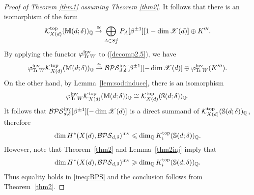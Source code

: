 \documentclass [11pt,oneside,a4paper,mathscr]{amsart}
\theoremstyle{definition}
\renewcommand{\leq}{\leqslant}
\renewcommand{\geq}{\geqslant}
\newcommand{\X}{\mathscr{X}}
\newcommand{\Tr}{\mathop{\rm Tr}}
\begin{document}
\begin{proof}[Proof of Theorem \ref{thm1} assuming Theorem \ref{thm2}]
It follows that there is an isomorphism of the form 
\begin{align}\label{decomp2.5}
	\mathcal{K}_{X(d)}^{\rm{top}}(\mathbb{M}(d; \delta))_{\mathbb{Q}} \stackrel{\cong}{\to}
	\bigoplus_{A \in S_{\delta}^d}P_A[\beta^{\pm 1}][1-\dim \X(d)]\oplus K'''. 
	\end{align}
By applying the functor $\varphi_{\Tr W}^{\rm{inv}}$ to (\ref{decomp2.5}), we have 
\begin{align*}
	\varphi_{\Tr W}^{\rm{inv}}	\mathcal{K}_{X(d)}^{\rm{top}}(\mathbb{M}(d; \delta))_{\mathbb{Q}}
	\stackrel{\cong}{\to}\mathcal{BPS}^{\rm{inv}}_{d, \delta}[\beta^{\pm 1}][-\dim \X(d)] \oplus 
	\varphi_{\Tr W}^{\rm{inv}}(K'''). 
	\end{align*}
 On the other hand, by Lemma~\ref{lem:sod:induce}, there is
 an isomorphism 
\begin{align*}
	\varphi_{\Tr W}^{\rm{inv}}\mathcal{K}_{X(d)}^{\rm{top}}(\mathbb{M}(d; \delta))_{\mathbb{Q}}
	\cong \mathcal{K}_{X(d)}^{\rm{top}}(\mathbb{S}(d; \delta))_{\mathbb{Q}}. 	
\end{align*}
 It follows that 
$\mathcal{BPS}^{\rm{inv}}_{d, \delta}[\beta^{\pm 1}][-\dim \X(d)]$ is a direct 
summand of $\mathcal{K}_{X(d)}^{\rm{top}}(\mathbb{S}(d; \delta))_{\mathbb{Q}}$, therefore 
\begin{align}\label{ineq:BPS}
	\dim H^{\ast}(X(d), \mathcal{BPS}_{d, \delta})^{\rm{inv}} \leq 
	\dim_{\mathbb{Q}}K_i^{\rm{top}}(\mathbb{S}(d; \delta))_{\mathbb{Q}}. 
	\end{align}
 However, note that Theorem~\ref{thm2} and Lemma~\ref{thm2inj} imply that 
 \[\dim H^{\ast}(X(d), \mathcal{BPS}_{d, \delta})^{\rm{inv}} \geq 
	\dim_{\mathbb{Q}}K_i^{\rm{top}}(\mathbb{S}(d; \delta))_{\mathbb{Q}}.\]
Thus equality holds in \eqref{ineq:BPS} and the conclusion follows from Theorem~\ref{thm2}.
	\end{proof}








\end{document}
